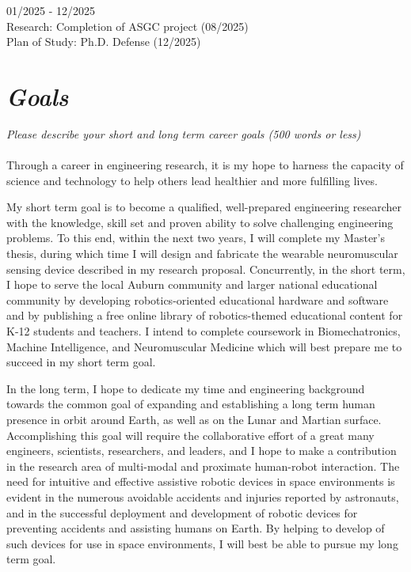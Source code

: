 \documentclass{article}
\begin{document}
01/2025 - 12/2025 \\
Research: Completion of ASGC project (08/2025)\\
Plan of Study: Ph.D. Defense (12/2025)


\clearpage

\section{\emph{Goals}} 

\small{\emph{Please describe your short and long term career goals (500 words or less)}}
\\
\\
\large
Through a career in engineering research, it is my hope to harness the capacity of science and technology to help others lead healthier and more fulfilling lives. 

My short term goal is to become a qualified, well-prepared engineering researcher with the knowledge, skill set and proven ability to solve challenging engineering problems. To this end, within the next two years, I will complete my Master’s thesis, during which time I will design and fabricate the wearable neuromuscular sensing device described in my research proposal. Concurrently, in the short term, I hope to serve the local Auburn community and larger national educational community by developing robotics-oriented educational hardware and software and by publishing a free online library of robotics-themed educational content for K-12 students and teachers. I intend to complete coursework in Biomechatronics, Machine Intelligence, and Neuromuscular Medicine which will best prepare me to succeed in my short term goal.

In the long term, I hope to dedicate my time and engineering background towards the common goal of expanding and establishing a long term human presence in orbit around Earth, as well as on the Lunar and Martian surface. Accomplishing this goal will require the collaborative effort of a great many engineers, scientists, researchers, and leaders, and I hope to make a contribution in the research area of multi-modal and proximate human-robot interaction. The need for intuitive and effective assistive robotic devices in space environments is evident in the numerous avoidable accidents and injuries reported by astronauts, and in the successful deployment and development of robotic devices for preventing accidents and assisting humans on Earth. By helping to develop of such devices for use in space environments, I will best be able to pursue my long term goal.
\end{document}
